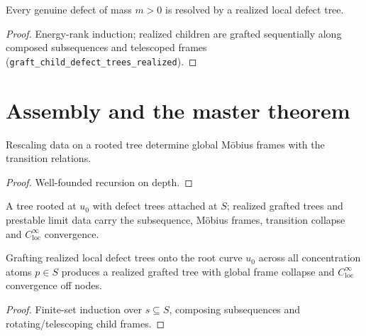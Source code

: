 \begin{theorem}
\label{b07_resolve}
\leanok
{}
Every genuine defect of mass $m>0$ is resolved by a realized local defect tree.
\end{theorem}
\begin{proof}\leanok Energy-rank induction; realized children are grafted sequentially along
composed subsequences and telescoped frames (\texttt{graft\_child\_defect\_trees\_realized}).\end{proof}

\chapter{Assembly and the master theorem}

\begin{lemma}
\label{g01_frames}
\leanok
{}
Rescaling data on a rooted tree determine global M\"obius frames with the transition relations.
\end{lemma}
\begin{proof}\leanok Well-founded recursion on depth.\end{proof}

\begin{definition}
\label{def_grafted_tree}
\leanok
{}
A tree rooted at $u_0$ with defect trees attached at $S$; realized grafted trees and prestable limit
data carry the subsequence, M\"obius frames, transition collapse and $C^\infty_{\mathrm{loc}}$ convergence.
\end{definition}

\begin{theorem}
\label{g01_grafted}
\leanok
{}
Grafting realized local defect trees onto the root curve $u_0$ across all concentration atoms $p\in S$
produces a realized grafted tree with global frame collapse and $C^\infty_{\mathrm{loc}}$ convergence
off nodes.
\end{theorem}
\begin{proof}\leanok Finite-set induction over $s\subseteq S$, composing subsequences and rotating/telescoping
child frames.\end{proof}

